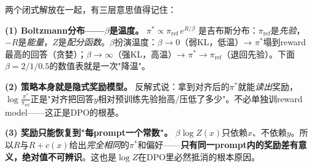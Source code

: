 \documentclass[11pt,a4paper]{article}
\theoremstyle{definition}
\begin{document}
\begin{intuition}
两个闭式解放在一起，有三层意思值得记住：

\textbf{(1) Boltzmann分布——$\beta$是温度。} $\pi^*\propto\pi_{\text{ref}}\,e^{R/\beta}$ 是吉布斯分布：$\pi_{\text{ref}}$是\emph{先验}，$-R$是\emph{能量}，$Z$是\emph{配分函数}。$\beta$扮演温度：$\beta\to0$（弱KL，低温）→ $\pi^*$塌到reward最高的回答（贪婪）；$\beta\to\infty$（强KL，高温）→ $\pi^*\to\pi_{\text{ref}}$（退回先验）。下面$\beta=2/1/0.5$的数值表就是一次"降温"。

\textbf{(2) 策略本身就是隐式奖励模型。} 反解式说：拿到对齐后的$\pi^*$就能\emph{读出}奖励，$\log\frac{\pi^*}{\pi_{\text{ref}}}$正是"对齐把回答$y$相对预训练先验抬高/压低了多少"。不必单独训reward model——这正是DPO的根基。

\textbf{(3) 奖励只能恢复到"每prompt一个常数"。} $\beta\log Z(x)$只依赖$x$、不依赖$y$。所以$R$与$R+c(x)$给出\emph{完全相同}的$\pi^*$和偏好——\textbf{只有同一prompt内的奖励差有意义，绝对值不可辨识}。这也是$\log Z$在DPO里必然抵消的根本原因。
\end{intuition}
\end{document}
